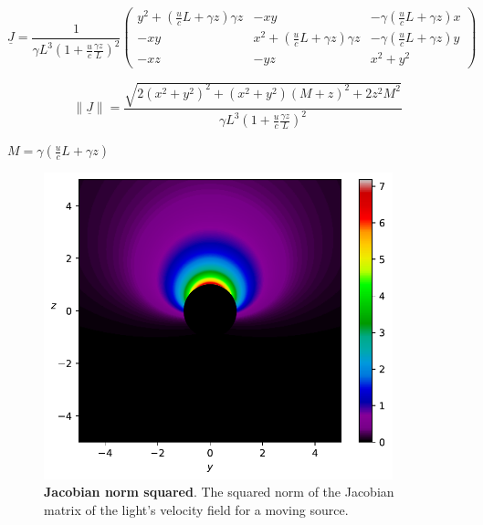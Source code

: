 \begin{equation}
	\underline{J} =
	\frac{1}{\gamma  L^3 ( 1 + \frac{u}{c} \frac{\gamma z}{L} )^2}
	\begin{pmatrix}
		y^2 +\left( \frac{u}{c} L +  \gamma z \right) \gamma z  & -xy & - \gamma ( \frac{u}{c} L + \gamma z  ) x \\
		- xy  & x^2 + \left( \frac{u}{c} L  +  \gamma z \right) \gamma z  & - \gamma (  \frac{u}{c}L  + \gamma z  ) y
		\\
		- xz & - yz &  x^2 + y^2
	\end{pmatrix}
\end{equation}

\begin{equation}
	\|\underline{J}\| = \frac{\sqrt{ 2 ( x^2+ y^2 )^2 + (x^2+y^2)(M+z)^2 + 2 z^2 M^2 } }{\gamma  L^3 ( 1 + \frac{u}{c} \frac{\gamma z}{L} )^2 }
\end{equation}

$M= \gamma (  \frac{u}{c}L  + \gamma z  )$



\begin{figure}[H]
	\centering
	\includegraphics[width=0.9\textwidth]{images/pdf/jacobian_of_lights_velocity_norm_squared_for_Moving_Source.pdf}
	\caption{\textbf{Jacobian norm squared}. The squared norm of the Jacobian matrix of the light's velocity field for a moving source.}
	\label{fig: Jacobian norm squared}
\end{figure}



